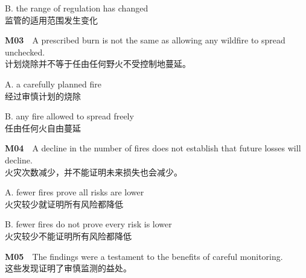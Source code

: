 \documentclass[a4paper,11pt,openany]{report}
\newcommand{\zhline}[1]{{\CJKsf\color{bodygrey}#1}}
\begin{document}
\begin{samepage}
B. the range of regulation has changed\\
\zhline{监管的适用范围发生变化}
\par\end{samepage}

\begin{samepage}
\textbf{M03}　A prescribed burn is not the same as allowing any wildfire to spread unchecked.\\
\zhline{计划烧除并不等于任由任何野火不受控制地蔓延。}
\par\end{samepage}

\begin{samepage}
A. a carefully planned fire\\
\zhline{经过审慎计划的烧除}
\par\end{samepage}

\begin{samepage}
B. any fire allowed to spread freely\\
\zhline{任由任何火自由蔓延}
\par\end{samepage}

\begin{samepage}
\textbf{M04}　A decline in the number of fires does not establish that future losses will decline.\\
\zhline{火灾次数减少，并不能证明未来损失也会减少。}
\par\end{samepage}

\begin{samepage}
A. fewer fires prove all risks are lower\\
\zhline{火灾较少就证明所有风险都降低}
\par\end{samepage}

\begin{samepage}
B. fewer fires do not prove every risk is lower\\
\zhline{火灾较少不能证明所有风险都降低}
\par\end{samepage}

\begin{samepage}
\textbf{M05}　The findings were a testament to the benefits of careful monitoring.\\
\zhline{这些发现证明了审慎监测的益处。}
\par\end{samepage}
\end{document}
